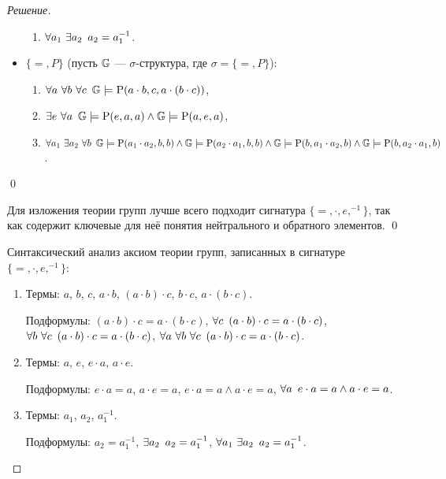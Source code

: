 \begin{proof}[Решение]
\begin{itemize}
\begin{enumerate}
                \item \(\forall a_1 \ \exists a_2 \enskip a_2 = a_1^{-1}\).
            \end{enumerate}
            \item \(\{=, P\}\) (пусть \(\mathbb{G}\) --- \(\sigma\)-структура, где \(\sigma = \{=, P\}\)):
            \begin{enumerate}
                \item \(\forall a \ \forall b \ \forall c \enskip \mathbb{G} \models \operatorname{P}(a \cdot b, c, a \cdot (b \cdot c))\),
                \item \(\exists e \ \forall a \enskip \mathbb{G} \models \operatorname{P}(e, a, a) \land \mathbb{G} \models \operatorname{P}(a, e, a)\),
                \item \(\forall a_1 \ \exists a_2 \ \forall b \enskip \mathbb{G} \models \operatorname{P}(a_1 \cdot a_2, b, b) \land \mathbb{G} \models \operatorname{P}(a_2 \cdot a_1, b, b) \land \mathbb{G} \models \operatorname{P}(b, a_1 \cdot a_2, b) \land \mathbb{G} \models \operatorname{P}(b, a_2 \cdot a_1, b)\).
            \end{enumerate}
        \end{itemize}
        \qed

        Для изложения теории групп лучше всего подходит сигнатура \(\{=, \cdot, e, ^{-1}\}\), так как содержит ключевые для неё понятия нейтрального и обратного элементов. \qed

        Синтаксический анализ аксиом теории групп, записанных в сигнатуре \(\{=, \cdot, e, ^{-1}\}\):
        \begin{enumerate}
            \item Термы: \(a\), \(b\), \(c\), \(a \cdot b\), \((a \cdot b) \cdot c\), \(b \cdot c\), \(a \cdot (b \cdot c)\).
            
            Подформулы: \((a \cdot b) \cdot c = a \cdot (b \cdot c)\), \(\forall c \enskip (a \cdot b) \cdot c = a \cdot (b \cdot c)\), \(\forall b \ \forall c \enskip (a \cdot b) \cdot c = a \cdot (b \cdot c)\), \(\forall a \ \forall b \ \forall c \enskip (a \cdot b) \cdot c = a \cdot (b \cdot c)\).

            \item Термы: \(a\), \(e\), \(e \cdot a\), \(a \cdot e\).

            Подформулы: \(e \cdot a = a\), \(a \cdot e = a\), \(e \cdot a = a \land a \cdot e = a\), \(\forall a \enskip e \cdot a = a \land a \cdot e = a\).

            \item Термы: \(a_1\), \(a_2\), \(a_1^{-1}\).
            
            Подформулы: \(a_2 = a_1^{-1}\), \(\exists a_2 \enskip a_2 = a_1^{-1}\), \(\forall a_1 \ \exists a_2 \enskip a_2 = a_1^{-1}\).
        \end{enumerate}
    \end{proof}

